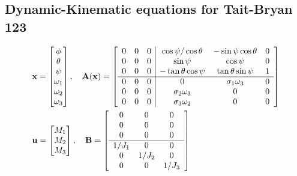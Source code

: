 \subsection{Dynamic-Kinematic equations for Tait-Bryan 123}
\begin{equation}
    \begin{aligned}
        &\mathbf{x}=\begin{bmatrix}
            \phi\\\theta\\\psi\\\omega_1\\\omega_2\\\omega_3
        \end{bmatrix}, \quad
        \mathbf{A(x)}=
        \left[
        \begin{array}{c|c}
            \begin{matrix}
                0&0&0\\0&0&0\\0&0&0\\
                \hline
                0&0&0\\0&0&0\\0&0&0
            \end{matrix}
            &
            \begin{matrix}
                \cos\psi/\cos\theta&-\sin\psi\cos\theta&0\\
                \sin\psi&\cos\psi&0\\
                -\tan\theta\cos\psi&\tan\theta\sin\psi&1\\
                \hline
                0&\sigma_1\omega_3&0\\
                \sigma_2\omega_3&0&0\\
                \sigma_3\omega_2&0&0
            \end{matrix} 
        \end{array}
        \right]\\\vspace{1cm}
        &\mathbf{u}=\begin{bmatrix}
            M_1\\M_2\\M_3
        \end{bmatrix}, \quad
        \mathbf{B}=
            \left[
                \begin{array}{c}
                    \begin{matrix}
                        0&0&0\\0&0&0\\0&0&0\\
                    \hline
                        1/J_1&0&0\\0&1/J_2&0\\0&0&1/J_3
                    \end{matrix}
                \end{array}
            \right]
    \end{aligned}
\end{equation}

